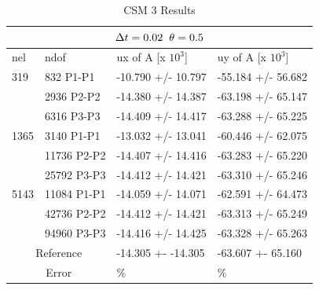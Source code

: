 \begin{table}[h!]
\centering
\caption{CSM 3 Results}
\label{CSM 3 Results}
\begin{tabular}{ |p{1cm}||p{2.7cm}|p{3.3cm}|p{3.3cm}|}
\hline
  \multicolumn{4}{|c|}{$\Delta t = 0.02 \hspace{2mm} \theta = 0.5$} \\
\hline
nel & ndof & ux of A [x $10^{3}$]  &uy of A [x $10^{3}$] \\
\hline
 319     & 832 P1-P1  & -10.790       +/-  10.797 & -55.184       +/-  56.682 \\
     & 2936 P2-P2 & -14.380       +/-  14.387 & -63.198       +/-  65.147 \\
      & 6316 P3-P3 & -14.409       +/-  14.417 & -63.288       +/-  65.225 \\
  \hline
   1365    & 3140 P1-P1 & -13.032       +/-  13.041 & -60.446       +/-  62.075 \\
     & 11736 P2-P2 & -14.407       +/-  14.416 & -63.283       +/-  65.220 \\
     & 25792 P3-P3 & -14.412       +/-  14.421 & -63.310       +/-  65.246 \\
   \hline
    5143    & 11084 P1-P1 & -14.059       +/-  14.071 & -62.591       +/-  64.473 \\
     & 42736 P2-P2  & -14.412       +/-  14.421 & -63.313       +/-  65.249 \\
     & 94960 P3-P3 & -14.416       +/-  14.425 & -63.328       +/-  65.263 \\
    \hline
  \multicolumn{2}{|c|}{Reference}  &-14.305 +- -14.305        & -63.607 +- 65.160    \\
   \hline
    \multicolumn{2}{|c|}{Error}  & \%   &  \%\\
   \hline
\end{tabular}
\end{table}

